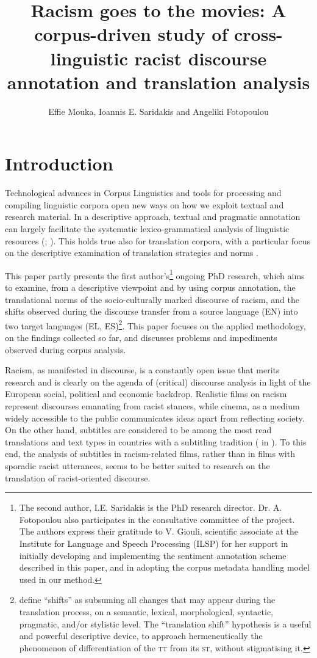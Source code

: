 \documentclass[output=paper]{LSP/langsci}
\author{Effie Mouka, Ioannis E. Saridakis and Angeliki Fotopoulou}
\title{Racism goes to the movies: A corpus-driven study of cross-linguistic racist discourse annotation and translation analysis}
\begin{document}
\section{Introduction} \label{sec:2:1}
Technological advances in Corpus Linguistics and tools for processing and compiling linguistic corpora open new ways on how we exploit textual and research material. In a descriptive approach, textual and pragmatic annotation can largely facilitate the systematic lexico-grammatical analysis of linguistic resources (\citealt[29--31]{EneryHardie2012}; \citealt[76--79]{Zanettin2012}). This holds true also for translation corpora, with a particular focus on the descriptive examination of translation strategies and norms \citep[78--96]{Zanettin2012}.

This paper partly presents the first author's\footnote{The second author, I.E. Saridakis is the PhD research director. Dr. A. Fotopoulou also participates in the consultative committee of the project. The authors express their gratitude to V. Giouli, scientific associate at the Institute for Language and Speech Processing (ILSP) for her support in initially developing and implementing the sentiment annotation scheme described in this paper, and in adopting the corpus metadata handling model used in our method.} ongoing PhD research, which aims to examine, from a descriptive viewpoint and by using corpus annotation, the translational norms of the socio-culturally marked discourse of racism, and the shifts observed during the discourse transfer from a source language (EN) into two target languages (EL, ES)\footnote{\citet[120--121]{Batsalia2010} define “shifts” as subsuming all changes that may appear during the translation process, on a semantic, lexical, morphological, syntactic, pragmatic, and/or stylistic level. The “translation shift” hypothesis is a useful and powerful descriptive device, to approach hermeneutically the phenomenon of differentiation of the \textsc{tt} from its \textsc{st}, without stigmatising it.}. This paper focuses on the applied methodology, on the findings collected so far, and discusses problems and impediments observed during corpus analysis.

Racism, as manifested in discourse, is a constantly open issue that merits research \citep{Dijk1993,Reisigl2001} and is clearly on the agenda of (critical) discourse analysis in light of the European social, political and economic backdrop. Realistic films on racism represent discourses emanating from racist stances, while cinema, as a medium widely accessible to the public communicates ideas apart from reflecting society. On the other hand, subtitles are considered to be among the most read translations and text types in countries with a subtitling tradition (\citealt[153]{Gottlieb1997} in \citealt[125]{Pedersen2011}). To this end, the analysis of subtitles in racism-related films, rather than in films with sporadic racist utterances, seems to be better suited to research on the translation of racist-oriented discourse.
\end{document}
